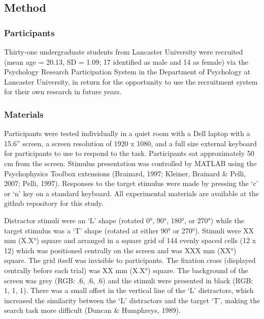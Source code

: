 \documentclass[
  man,floatsintext]{apa7}
\begin{document}
\hypertarget{method}{%
\subsection{Method}\label{method}}

\hypertarget{participants}{%
\subsubsection{Participants}\label{participants}}

Thirty-one undergraduate students from Lancaster University were recruited (mean age = 20.13, SD = 1.09; 17 identified as male and 14 as female) via the Psychology Research Participation System in the Department of Psychology at Lancaster University, in return for the opportunity to use the recruitment system for their own research in future years.

\hypertarget{materials}{%
\subsubsection{Materials}\label{materials}}

Participants were tested individually in a quiet room with a Dell laptop with a 15.6'' screen, a screen resolution of 1920 x 1080, and a full size external keyboard for participants to use to respond to the task. Participants sat approximately 50 cm from the screen. Stimulus presentation was controlled by MATLAB using the Psychophysics Toolbox extensions (Brainard, 1997; Kleiner, Brainard \& Pelli, 2007; Pelli, 1997). Responses to the target stimulus were made by pressing the `c' or `n' key on a standard keyboard. All experimental materials are available at the github repository for this study.

Distractor stimuli were an `L' shape (rotated 0°, 90°, 180°, or 270°) while the target stimulus was a `T' shape (rotated at either 90° or 270°). Stimuli were XX mm (X.X°) square and arranged in a square grid of 144 evenly spaced cells (12 x 12) which was positioned centrally on the screen and was XXX mm (XX°) square. The grid itself was invisible to participants. The fixation cross (displayed centrally before each trial) was XX mm (X.X°) square. The background of the screen was grey (RGB: .6, .6, .6) and the stimuli were presented in black (RGB: 1, 1, 1). There was a small offset in the vertical line of the `L' distractors, which increased the similarity between the `L' distractors and the target `T', making the search task more difficult (Duncan \& Humphreys, 1989).
\end{document}
